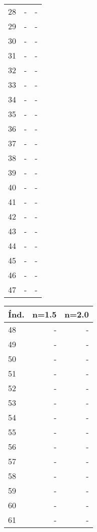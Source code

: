 \begin{appendix}
\begin{table}[h!]
\begin{tabular}{|l|r|r|}
28    & -        & -        \\
29    & -        & -        \\
30    & -        & -        \\
31    & -        & -        \\
32    & -        & -        \\
33    & -        & -        \\
34    & -        & -        \\
35    & -        & -        \\
36    & -        & -        \\
37    & -        & -        \\
38    & -        & -        \\
39    & -        & -        \\
40    & -        & -        \\
41    & -        & -        \\
42    & -        & -        \\
43    & -        & -        \\
44    & -        & -        \\
45    & -        & -        \\
46    & -        & -        \\
47    & -        & -        \\\hline
\end{tabular}
\quad
\begin{tabular}{|l|r|r|}
\hline
\textbf{\'Ind.} & \textbf{n=1.5} & \textbf{n=2.0}\\\hline
48    & -        & -        \\
49    & -        & -        \\
50    & -        & -        \\
51    & -        & -        \\
52    & -        & -        \\
53    & -        & -        \\
54    & -        & -        \\
55    & -        & -        \\
56    & -        & -        \\
57    & -        & -        \\
58    & -        & -        \\
59    & -        & -        \\
60    & -        & -        \\
61    & -        & -        \\

\end{tabular}
\end{table}
\end{appendix}
